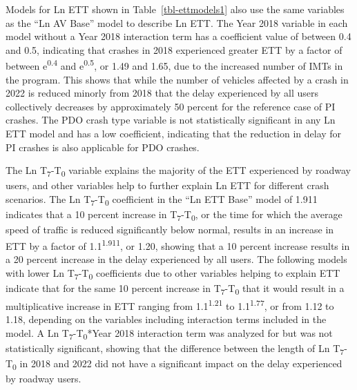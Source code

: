 \documentclass[
  letterpaper,
  authoryear]{elsarticle}
\begin{document}
Models for Ln ETT shown in Table~\ref{tbl-ettmodels1} also use the same
variables as the ``Ln AV Base'' model to describe Ln ETT. The Year 2018
variable in each model without a Year 2018 interaction term has a
coefficient value of between 0.4 and 0.5, indicating that crashes in
2018 experienced greater ETT by a factor of between
e\textsuperscript{0.4} and e\textsuperscript{0.5}, or 1.49 and 1.65, due
to the increased number of IMTs in the program. This shows that while
the number of vehicles affected by a crash in 2022 is reduced minorly
from 2018 that the delay experienced by all users collectively decreases
by approximately 50 percent for the reference case of PI crashes. The
PDO crash type variable is not statistically significant in any Ln ETT
model and has a low coefficient, indicating that the reduction in delay
for PI crashes is also applicable for PDO crashes.

The Ln T\textsubscript{7}-T\textsubscript{0} variable explains the
majority of the ETT experienced by roadway users, and other variables
help to further explain Ln ETT for different crash scenarios. The Ln
T\textsubscript{7}-T\textsubscript{0} coefficient in the ``Ln ETT Base''
model of 1.911 indicates that a 10 percent increase in
T\textsubscript{7}-T\textsubscript{0}, or the time for which the average
speed of traffic is reduced significantly below normal, results in an
increase in ETT by a factor of 1.1\textsuperscript{1.911}, or 1.20,
showing that a 10 percent increase results in a 20 percent increase in
the delay experienced by all users. The following models with lower Ln
T\textsubscript{7}-T\textsubscript{0} coefficients due to other
variables helping to explain ETT indicate that for the same 10 percent
increase in T\textsubscript{7}-T\textsubscript{0} that it would result
in a multiplicative increase in ETT ranging from
1.1\textsuperscript{1.21} to 1.1\textsuperscript{1.77}, or from 1.12 to
1.18, depending on the variables including interaction terms included in
the model. A Ln T\textsubscript{7}-T\textsubscript{0}*Year 2018
interaction term was analyzed for but was not statistically significant,
showing that the difference between the length of Ln
T\textsubscript{7}-T\textsubscript{0} in 2018 and 2022 did not have a
significant impact on the delay experienced by roadway users.
\end{document}
